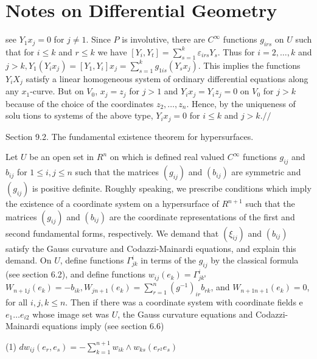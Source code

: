 \documentclass[10pt]{article}
\begin{document}
\section{Notes on Differential Geometry}
see $Y_{1} x_{j}=0$ for $j \neq 1$. Since $P$ is involutive, there are $C^{\infty}$ functions $g_{i r s}$ on $U$ such that for $i \leq k$ and $r \leq k$ we have $\left[Y_{i}, Y_{t}\right]=\sum_{s=1}^{k} \varepsilon_{i r s} Y_{s}$. Thus for $i=2, \ldots, k$ and $j>k, Y_{1}\left(Y_{i} x_{j}\right)=\left[Y_{1}, Y_{i}\right] x_{j}=\sum_{s=1}^{k} g_{1 i s}\left(Y_{s} x_{j}\right)$. This implies the functions $Y_{i} X_{j}$ satisfy a linear homogeneous system of ordinary differential equations along any $x_{1}$-curve. But on $V_{0}$, $x_{j}=z_{j}$ for $j>1$ and $Y_{i} x_{j}=Y_{i} z_{j}=0$ on $V_{0}$ for $j>k$ because of the choice of the coordinates $z_{2}, \ldots, z_{n}$. Hence, by the uniqueness of solu tions to systems of the above type, $Y_{i} x_{j}=0$ for $i \leq k$ and $j>k . / /$


Section 9.2. The fundamental existence theorem for hypersurfaces.

Let $U$ be an open set in $R^{n}$ on which is defined real valued $C^{\infty}$ functions $g_{i j}$ and $b_{i j}$ for $1 \leq i, j \leq n$ such that the matrices $\left(g_{i j}\right)$ and $\left(b_{i j}\right)$ are symmetric and $\left(g_{i j}\right)$ is positive definite. Roughly speaking, we prescribe conditions which imply the existence of a coordinate system on a hypersurface of $R^{n+1}$ such that the matrices $\left(g_{i j}\right)$ and $\left(b_{i j}\right)$ are the coordinate representations of the first and second fundamental forms, respectively. We demand that $\left(\xi_{i j}\right)$ and $\left(b_{i j}\right)$ satisfy the Gauss curvature and Codazzi-Mainardi equations, and explain this demand. On $U$, define functions $\Gamma_{j k}^{i}$ in terms of the $g_{i j}$ by the classical formula (see section 6.2), and define functions $w_{i j}\left(e_{k}\right)=\Gamma_{j k^{s}}^{i}$ $W_{n+1 j}\left(e_{k}\right)=-b_{i k}, W_{j n+1}\left(e_{k}\right)=\sum_{r=1}^{n}\left(g^{-1}\right)_{i r} b_{r k}$, and $W_{n+1 n+1}\left(e_{k}\right)=0$, for all $i, j, k \leq n$. Then if there was a coordinate system with coordinate fields e $e_{1} \ldots e_{i 2}$ whose image set was $U$, the Gauss curvature equations and Codazzi-Mainardi equations imply (see section 6.6)

(1) $d w_{i j}\left(e_{r}, e_{s}\right)=-\sum_{k=1}^{n+1} w_{i k} \wedge w_{k s}\left(e_{r^{2}} e_{s}\right)$
\end{document}
